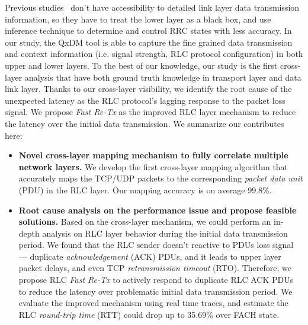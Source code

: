 Previous studies~\cite{3g_rrc, 4g_rrc, aro, opt.tcp.rlc} don't have accessibility to detailed link layer data transmission information, so they have to treat the lower layer as a black box, and use inference technique to determine and control RRC states with less accuracy. In our study, the QxDM tool is able to capture the fine grained data transmission and context information (i.e. signal strength, RLC protocol configuration) in both upper and lower layers. To the best of our knowledge, our study is the first cross-layer analysis that have both ground truth knowledge in transport layer and data link layer. Thanks to our cross-layer visibility, we identify the root cause of the unexpected latency as the RLC protocol's lagging response to the packet loss signal. We propose \emph{Fast Re-Tx} as the improved RLC layer mechanism to reduce the latency over the initial data transmission. We summarize our contributes here:

\begin{itemize}
\item \textbf{Novel cross-layer mapping mechanism to fully correlate multiple network layers.} We develop the first cross-layer mapping algorithm that accurately maps the TCP/UDP packets to the corresponding \textit{packet data unit} (PDU) in the RLC layer. Our mapping accuracy is on average 99.8\%.
\item \textbf{Root cause analysis on the performance issue and propose feasible solutions.} Based on the cross-layer mechanism, we could perform an in-depth analysis on RLC layer behavior during the initial data transmission period. We found that the RLC sender doesn't reactive to PDUs loss signal --- duplicate \textit{acknowledgement} (ACK) PDUs, and it leads to upper layer packet delays, and even TCP \textit{retransmission timeout} (RTO). Therefore, we propose RLC \emph{Fast Re-Tx} to actively respond to duplicate RLC ACK PDUs to reduce the latency over problematic initial data transmission period. We evaluate the improved mechanism using real time traces, and estimate the RLC \textit{round-trip time} (RTT) could drop up to 35.69\% over FACH state.
\end{itemize}



\label{sec:intro}

